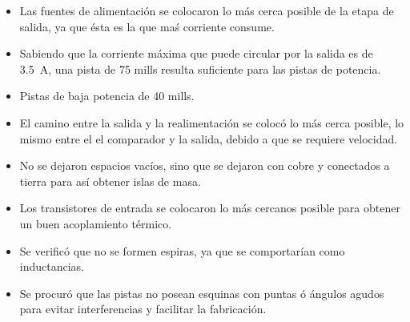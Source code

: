 \begin{itemize}
	\item Las fuentes de alimentación se colocaron lo más cerca posible de la etapa de salida, ya que ésta es la que maś corriente consume.
	\item Sabiendo que la corriente máxima que puede circular por la salida es de \SI{3.5}{\ampere}, una pista de 75 mills resulta suficiente para las pistas de potencia.
	\item Pistas de baja potencia de 40 mills.
	\item El camino entre la salida y la realimentación se colocó lo más cerca posible, lo mismo entre el el comparador y la salida, debido a que se requiere velocidad. 
	\item No se dejaron espacios vacíos, sino que se dejaron con cobre y conectados a tierra para así obtener islas de masa.
	\item Los transistores de entrada se colocaron lo más cercanos posible para obtener un buen acoplamiento térmico.
	\item Se verificó que no se formen espiras, ya que se comportarían como inductancias.
	\item Se procuró que las pistas no posean esquinas con puntas ó ángulos agudos para evitar interferencias y facilitar la fabricación.

\end{itemize}
